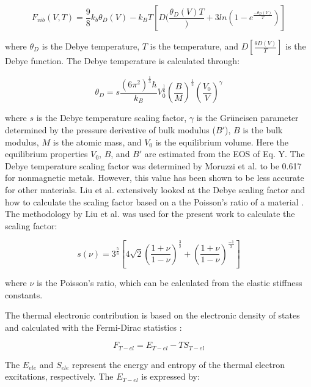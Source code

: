 \begin{equation}
\label{eq: debye}
F_{vib}(V,T) = \frac{9}{8} k_{b} \theta_{D}(V) - k_{B}T[D (\frac{\theta_D(V){T}}) + 3ln(1-e^{\frac{-\theta_{D}(V)}{T}})] 
\end{equation}

\noindent where $\theta_{D}$ is the Debye temperature, $T$ is the temperature, and $D[\frac{\theta{D}(V)}{T}]$ is the Debye function. The Debye temperature is calculated through: 

\begin{equation}
\label{eq: debyetemp}
\theta_{D} = s \frac{(6\pi^2)^{\frac{1}{3}}\hbar}{k_B} V_{0}^{\frac{1}{6}} (\frac{B}{M})^{\frac{1}{2}} (\frac{V_0}{V})^{\gamma} 
\end{equation}

\noindent where $s$ is the Debye temperature scaling factor, $\gamma$ is the Grüneisen parameter determined by the pressure derivative of bulk modulus ($B'$), $B$ is the bulk modulus, $M$ is the atomic mass, and $V_0$ is the equilibrium volume. Here the equilibrium properties $V_0$, $B$, and $B'$ are estimated from the EOS of Eq. Y. The Debye temperature scaling factor was determined by Moruzzi et al. \cite{Moruzzi1988} to be 0.617 for nonmagnetic metals. However, this value has been shown to be less accurate for other materials. Liu et al. extensively looked at the Debye scaling factor and how to calculate the scaling factor based on a the Poisson’s ratio of a material \cite{Liu2015}. The methodology by Liu et al. \cite{Liu2015} was used for the present work to calculate the scaling factor: 

\begin{equation}
\label{eq: debyescaling}
s(\nu) = 3^{\frac{5}{6}} [4\sqrt{2} (\frac{1 + \nu}{1 - \nu})^{\frac{3}{2}} + (\frac{1 + \nu}{1 - \nu})^{\frac{-1}{3}}]
\end{equation}

\noindent where $\nu$ is the Poisson’s ratio, which can be calculated from the elastic stiffness constants.

The thermal electronic contribution is based on the electronic density of states and calculated with the Fermi-Dirac statistics \cite{Shang2010,Wang2004}:

\begin{equation}
\label{eq:thermalelectronic}
F_{T-el} = E_{T-el} - T S_{T-el}
\end{equation}

The $E_{ele}$ and $S_{ele}$ represent the energy and entropy of the thermal electron excitations, respectively. The $E_{T-el}$ is expressed by:

